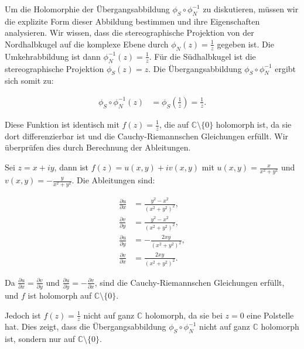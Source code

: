 Um die Holomorphie der Übergangsabbildung $\phi_S \circ \phi_N^{-1}$ zu diskutieren, müssen wir die explizite Form dieser Abbildung bestimmen und ihre Eigenschaften analysieren. Wir wissen, dass die stereographische Projektion von der Nordhalbkugel auf die komplexe Ebene durch $\phi_N(z) = \frac{1}{z}$ gegeben ist. Die Umkehrabbildung ist dann $\phi_N^{-1}(z) = \frac{1}{z}$. Für die Südhalbkugel ist die stereographische Projektion $\phi_S(z) = z$. Die Übergangsabbildung $\phi_S \circ \phi_N^{-1}$ ergibt sich somit zu:

\begin{align*}
\phi_S \circ \phi_N^{-1}(z) &= \phi_S\left(\frac{1}{z}\right) = \frac{1}{z}.
\end{align*}

Diese Funktion ist identisch mit $f(z) = \frac{1}{z}$, die auf $\mathbb{C} \setminus \{0\}$ holomorph ist, da sie dort differenzierbar ist und die Cauchy-Riemannschen Gleichungen erfüllt. Wir überprüfen dies durch Berechnung der Ableitungen.

Sei $z = x + iy$, dann ist $f(z) = u(x, y) + iv(x, y)$ mit $u(x, y) = \frac{x}{x^2 + y^2}$ und $v(x, y) = -\frac{y}{x^2 + y^2}$. Die Ableitungen sind:

\begin{align*}
\frac{\partial u}{\partial x} &= \frac{y^2 - x^2}{(x^2 + y^2)^2}, \\
\frac{\partial v}{\partial y} &= \frac{y^2 - x^2}{(x^2 + y^2)^2}, \\
\frac{\partial u}{\partial y} &= -\frac{2xy}{(x^2 + y^2)^2}, \\
\frac{\partial v}{\partial x} &= \frac{2xy}{(x^2 + y^2)^2}.
\end{align*}

Da $\frac{\partial u}{\partial x} = \frac{\partial v}{\partial y}$ und $\frac{\partial u}{\partial y} = -\frac{\partial v}{\partial x}$, sind die Cauchy-Riemannschen Gleichungen erfüllt, und $f$ ist holomorph auf $\mathbb{C} \setminus \{0\}$.

Jedoch ist $f(z) = \frac{1}{z}$ nicht auf ganz $\mathbb{C}$ holomorph, da sie bei $z=0$ eine Polstelle hat. Dies zeigt, dass die Übergangsabbildung $\phi_S \circ \phi_N^{-1}$ nicht auf ganz $\mathbb{C}$ holomorph ist, sondern nur auf $\mathbb{C} \setminus \{0\}$.

